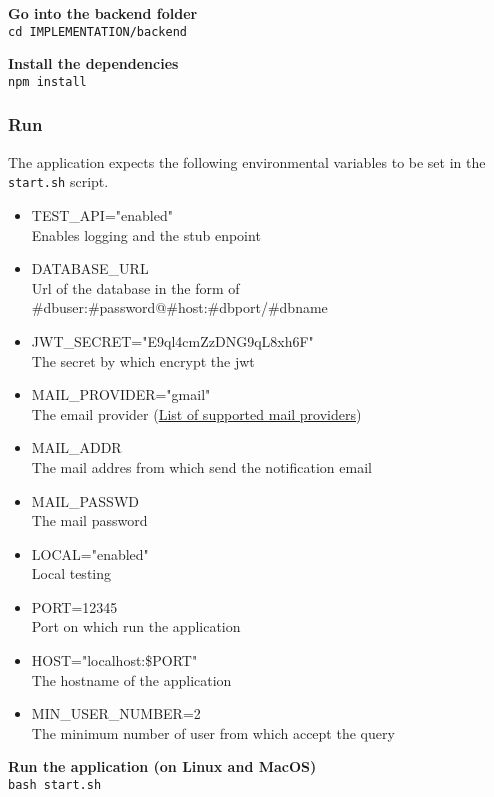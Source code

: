 \vspace{0.5em}
\noindent \textbf{Go into the backend folder}\\
\texttt{cd IMPLEMENTATION/backend}\\
\vspace{0.3em}


\vspace{0.5em}
\noindent \textbf{Install the dependencies}\\
\texttt{npm install }\\
\vspace{0.3em}

\subsubsection{Run}
The application expects the following environmental variables to be set in the \texttt{start.sh} script.
\begin{itemize}
    \item TEST\_API="enabled"\\ Enables logging and the stub enpoint
    \item DATABASE\_URL \\ Url of the database in the form of \\\#dbuser:\#password@\#host:\#dbport/\#dbname
    \item JWT\_SECRET="E9ql4cmZzDNG9qL8xh6F"\\ The secret by which encrypt the jwt
    \item MAIL\_PROVIDER="gmail"\\ The email provider (\href{https://nodemailer.com/smtp/well-known/}{List of supported mail providers})
    \item MAIL\_ADDR\\ The mail addres from which send the notification email
    \item MAIL\_PASSWD\\ The mail password 
    \item LOCAL="enabled"\\ Local testing 
    \item PORT=12345 \\ Port on which run the application
    \item HOST="localhost:\${PORT}"\\ The hostname of the application
    \item MIN\_USER\_NUMBER=2\\ The minimum number of user from which accept the query
\end{itemize}
\vspace{0.3em}
\noindent \textbf{Run the application (on Linux and MacOS)} \\
\texttt{bash start.sh}

